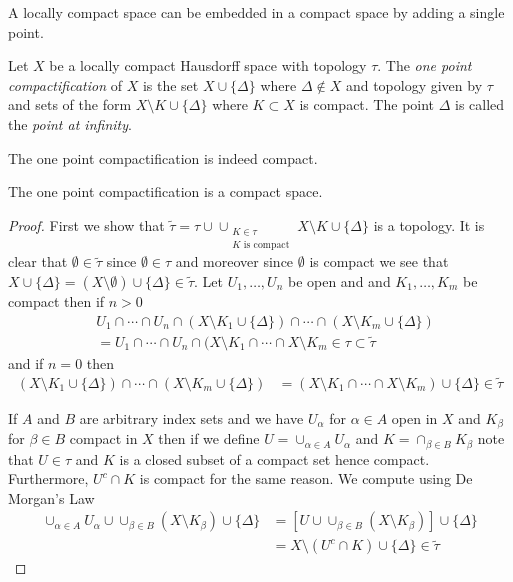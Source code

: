 A locally compact space can be embedded in a compact space by adding a single point.
\begin{defn}\label{OnePointCompactificationDefinition}Let $X$ be a locally compact Hausdorff space with topology $\tau$.  The \emph{one point compactification} of $X$ is the set
$X \cup \lbrace \Delta \rbrace$ where $\Delta \notin X$ and topology given by $\tau$ and sets of the form $X \setminus K \cup \lbrace \Delta \rbrace$
where $K \subset X$ is compact.  The point $\Delta$ is called the \emph{point at infinity}.
\end{defn}
The one point compactification is indeed compact.
\begin{thm}\label{OnePointCompactification}The one point compactification is a compact space.
\end{thm}
\begin{proof}
First we show that $\tilde{\tau} = \tau \cup \cup_{\substack{K \in \tau \\ K \text{ is compact}}} X \setminus K \cup \lbrace \Delta \rbrace$ is a topology.  It is clear that
$\emptyset \in \tilde{\tau}$ since $\emptyset \in \tau$ and moreover since $\emptyset$ is compact we see that $X \cup \lbrace \Delta \rbrace = (X \setminus \emptyset) \cup \lbrace \Delta\rbrace \in \tilde{\tau}$.  
Let $U_1, \dotsc, U_n$ be open and and $K_1, \dotsc, K_m$ be compact then if $n > 0$
\begin{align*}
&U_1 \cap \dotsb \cap U_n \cap (X \setminus K_1 \cup \lbrace \Delta \rbrace) \cap \dotsb \cap (X \setminus K_m \cup \lbrace \Delta \rbrace) \\
&=U_1 \cap \dotsb \cap U_n \cap (X \setminus K_1 \cap \dotsb \cap X \setminus K_m  \in \tau \subset \tilde{\tau}
\end{align*}
and if $n = 0$ then 
\begin{align*}
(X \setminus K_1 \cup \lbrace \Delta \rbrace) \cap \dotsb \cap (X \setminus K_m \cup \lbrace \Delta \rbrace)
&= (X \setminus K_1 \cap \dotsb \cap X \setminus K_m) \cup \lbrace \Delta \rbrace \in \tilde{\tau}
\end{align*}

If $A$ and $B$ are arbitrary index sets and we have $U_\alpha$ for $\alpha \in A$ open in $X$ and $K_\beta$ for $\beta \in B$ compact in $X$ then
if we define $U = \cup_{\alpha \in A} U_\alpha$ and $K= \cap_{\beta \in B} K_\beta$ note that $U \in \tau$ and $K$ is a closed subset of a compact set hence compact.  Furthermore, $U^c \cap K$ is compact for the same reason.  We compute using De Morgan's Law
\begin{align*}
\cup_{\alpha \in A} U_\alpha \cup \cup_{\beta \in B} (X \setminus K_\beta) \cup \lbrace \Delta \rbrace &=
\left[ U \cup \cup_{\beta \in B} (X \setminus K_\beta) \right ] \cup \lbrace \Delta \rbrace \\
&=X \setminus (U^c \cap K) \cup \lbrace \Delta \rbrace \in \tilde{\tau}
\end{align*}


\end{proof}

